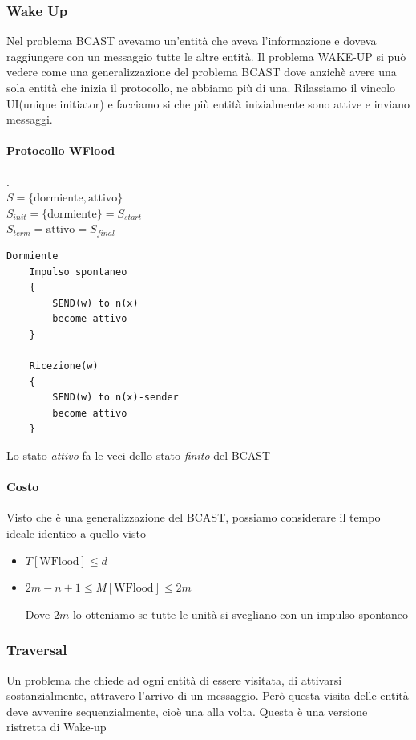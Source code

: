\subsubsection{Wake Up}
Nel problema BCAST avevamo un'entità che aveva l'informazione e doveva raggiungere con un messaggio tutte le altre entità. Il problema WAKE-UP si può vedere come una generalizzazione del problema BCAST dove anzichè avere una sola entità che inizia il protocollo, ne abbiamo più di una. Rilassiamo il vincolo UI(unique initiator) e facciamo si che più entità inizialmente sono attive e inviano messaggi. 

\paragraph{Protocollo WFlood}
.\\$S = \{\text{dormiente}, \text{attivo}\}$\\
$S_{init} = \{\text{dormiente}\} = S_{start}$\\
$S_{term} = \text{attivo} = S_{final}$

\begin{lstlisting}
Dormiente
    Impulso spontaneo
    {
        SEND(w) to n(x)
        become attivo
    }

    Ricezione(w)
    {
        SEND(w) to n(x)-sender
        become attivo
    }
\end{lstlisting}

Lo stato \textit{attivo} fa le veci dello stato \textit{finito} del BCAST

\paragraph{Costo}
Visto che è una generalizzazione del BCAST, possiamo considerare il tempo ideale identico a quello visto
\begin{itemize}
    \item $T[\text{WFlood}]\leq d$
    \item $2m - n + 1 \leq M[\text{WFlood}] \leq 2m$

    
    Dove $2m$ lo otteniamo se tutte le unità si svegliano con un impulso spontaneo
\end{itemize}



\subsubsection{Traversal}
Un problema che chiede ad ogni entità di essere visitata, di attivarsi sostanzialmente, attravero l'arrivo di un messaggio. Però questa visita delle entità deve avvenire sequenzialmente, cioè una alla volta. Questa è una versione ristretta di Wake-up

